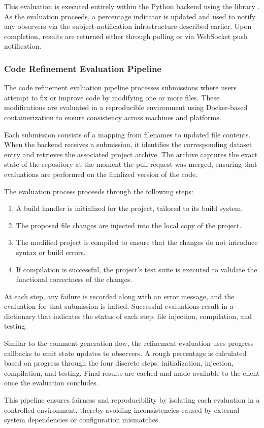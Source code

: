 This evaluation is executed entirely within the Python backend using the  library
\cite{sacre-bleu}.
As the evaluation proceeds, a percentage indicator is updated and used to notify any observers via
the subject-notification infrastructure described earlier. Upon completion, results are returned
either through polling or via WebSocket push notification.

\subsubsection{Code Refinement Evaluation Pipeline}
\label{sec:refinement}

The code refinement evaluation pipeline processes submissions where users attempt to fix or improve
code by modifying one or more files. These modifications are evaluated in a reproducible environment
using Docker-based containerization to ensure consistency across machines and platforms.

Each submission consists of a mapping from filenames to updated file contents. When the backend
receives a submission, it identifies the corresponding dataset entry and retrieves the associated
project archive. The archive captures the exact state of the repository at the moment the pull
request was merged, ensuring that evaluations are performed on the finalized version of the code.

The evaluation process proceeds through the following steps:
\begin{enumerate}
	\item A build handler is initialized for the project, tailored to its build system.
	\item The proposed file changes are injected into the local copy of the project.
	\item The modified project is compiled to ensure that the changes do not introduce syntax or build
	      errors.
	\item If compilation is successful, the project’s test suite is executed to validate the
	      functional correctness of the changes.
\end{enumerate}

At each step, any failure is recorded along with an error message, and the evaluation for that
submission is halted. Successful evaluations result in a dictionary that indicates the status of
each step: file injection, compilation, and testing.

Similar to the comment generation flow, the refinement evaluation uses progress callbacks to emit
state updates to observers. A rough percentage is calculated based on progress through the four
discrete steps: initialization, injection, compilation, and testing. Final results are cached and
made available to the client once the evaluation concludes.

This pipeline ensures fairness and reproducibility by isolating each evaluation in a controlled
environment, thereby avoiding inconsistencies caused by external system dependencies or
configuration mismatches.

